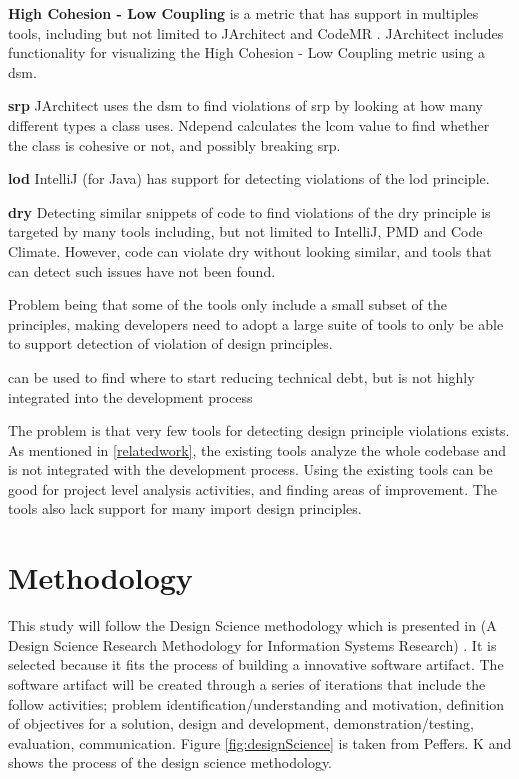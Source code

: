 \documentclass{report}
\begin{document}
\textbf{High Cohesion - Low Coupling} is a metric that has support in multiples tools, including but not limited to JArchitect \cite{jarchitect} and CodeMR \cite{codemr}. JArchitect \cite{jarchitect} includes functionality for visualizing the High Cohesion - Low Coupling metric using a \gls{dsm}. 

\textbf{\gls{srp}}
JArchitect uses the \gls{dsm} to find violations of \gls{srp} by looking at how many different types a class uses. Ndepend \cite{ndepend} calculates the \gls{lcom} value to find whether the class is cohesive or not, and possibly breaking \gls{srp}. 

\textbf{\gls{lod}}
IntelliJ \cite{IntelliJ} (for Java) has support for detecting violations of the \gls{lod} principle.

\textbf{\gls{dry}}
Detecting similar snippets of code to find violations of the \gls{dry} principle is targeted by many tools including, but not limited to IntelliJ, PMD and Code Climate. However, code can violate \gls{dry} without looking similar, and tools that can detect such issues have not been found.  




Problem being that some of the tools only include a small subset of the principles, making developers need to adopt a large suite of tools to only be able to support detection of violation of design principles.

can be used to find where to start reducing technical debt, but is not highly integrated into the development process 

The problem is that very few tools for detecting design principle violations exists. As mentioned in \ref{relatedwork}, the existing tools analyze the whole codebase and is not integrated with the development process. Using the existing tools can be good for project level analysis activities, and finding areas of improvement. The tools also lack support for many import design principles.

\chapter{Methodology}
\label{methodology}
This study will follow the Design Science methodology which is presented in (A Design Science Research Methodology for Information Systems Research) \cite{10.2753/MIS0742-1222240302}. It is selected because it fits the process of building a innovative software artifact. The software artifact will be created through a series of iterations that include the follow activities; problem identification/understanding and motivation, definition of objectives for a solution, design and development, demonstration/testing, evaluation, communication. Figure \ref{fig:designScience} is taken from Peffers. K \cite{Peffers2007ADS} and shows the process of the design science methodology. 
\end{document}
